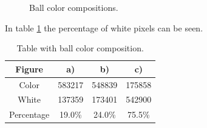 \begin{figure}[htpb]
\centering
{}
\quad
{}
\quad
{}

\caption{Ball color compositions.}
\label{fig:ballscompo}
\end{figure}

In table \ref{fig:ballscompotable} the percentage of white pixels can be seen.

\begin{table}[htpb]
\centering
\begin{tabular}{|c|c|c|c|}
	\hline Figure & a) & b) & c) \\ 
	\hline Color & 583217 & 548839 & 175858 \\ 
	\hline White & 137359 & 173401 & 542900 \\ 
	\hline Percentage & 19.0\% & 24.0\% & 75.5\% \\ 
	\hline
\end{tabular}
\caption{Table with ball color composition.}
\label{fig:ballscompotable}
\end{table}

